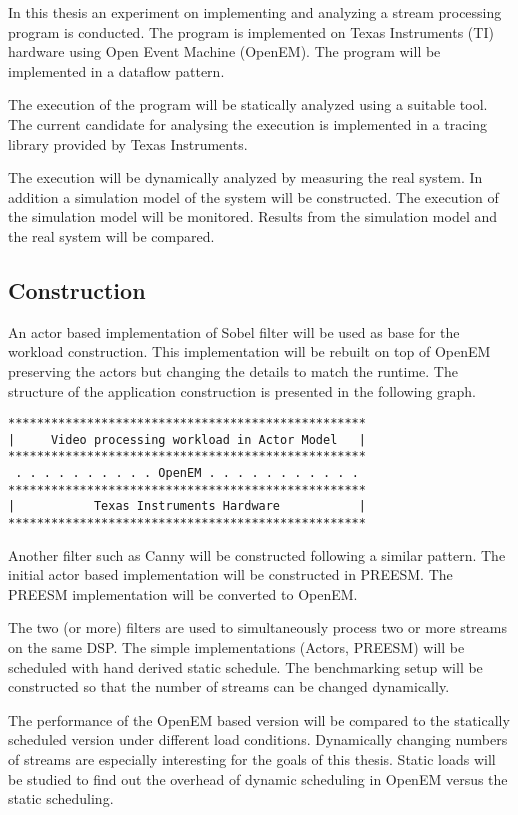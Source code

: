 In this thesis an experiment on implementing and analyzing a stream processing program is conducted. The program is implemented on Texas Instruments (TI) hardware using Open Event Machine (OpenEM). The program will be implemented in a dataflow pattern.

The execution of the program will be statically analyzed using a suitable tool. The current candidate for analysing the execution is implemented in a tracing library provided by Texas Instruments.

The execution will be dynamically analyzed by measuring the real system. In addition a simulation model of the system will be constructed. The execution of the simulation model will be monitored. Results from the simulation model and the real system will be compared.

\subsection{Construction}
An actor based implementation of Sobel filter will be used as base for the workload construction. This implementation will be rebuilt on top of OpenEM preserving the actors but changing the details to match the runtime. The structure of the application construction is presented in the following graph.

\begin{samepage}
\begin{verbatim}
**************************************************
|     Video processing workload in Actor Model   |
**************************************************
 . . . . . . . . . . OpenEM . . . . . . . . . . .
**************************************************
|           Texas Instruments Hardware           |
**************************************************
\end{verbatim}
\end{samepage}

Another filter such as Canny will be constructed following a similar pattern. The initial actor based implementation will be constructed in PREESM. The PREESM implementation will be converted to OpenEM.

The two (or more) filters are used to simultaneously process two or more streams on the same DSP. The simple implementations (Actors, PREESM) will be scheduled with hand derived static schedule. The benchmarking setup will be constructed so that the number of streams can be changed dynamically.

The performance of the OpenEM based version will be compared to the statically scheduled version under different load conditions. Dynamically changing numbers of streams are especially interesting for the goals of this thesis. Static loads will be studied to find out the overhead of dynamic scheduling in OpenEM versus the static scheduling. 

